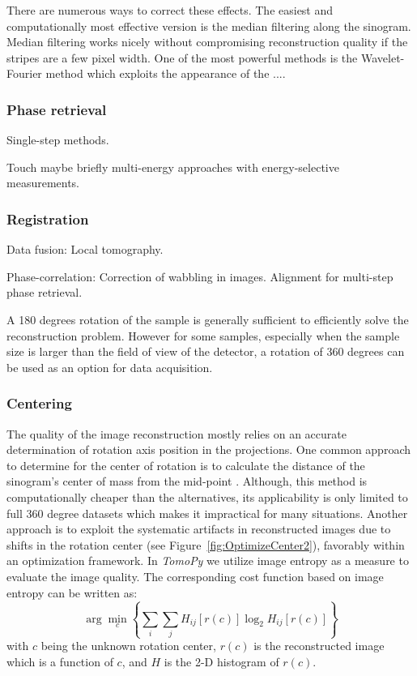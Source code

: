 \documentclass[pdf]{iucr}              %
\begin{document}
There are numerous ways to correct these effects. The easiest and computationally most effective version is the median filtering along the sinogram. Median filtering works nicely without compromising reconstruction quality if the stripes are a few pixel width. One of the most powerful methods is the Wavelet-Fourier method which exploits the appearance of the ....

\subsubsection{Phase retrieval}

Single-step methods. 

Touch maybe briefly multi-energy approaches with energy-selective measurements.


\subsubsection{Registration}

Data fusion: Local tomography. 

Phase-correlation: Correction of wabbling in images. Alignment for multi-step phase retrieval.

A 180 degrees rotation of the sample is generally sufficient to efficiently solve the reconstruction problem. However for some samples, especially when the sample size is larger than the field of view of the detector, a  rotation of 360 degrees can be used as an option for data acquisition. 

\subsubsection{Centering}

The quality of the image reconstruction mostly relies on an accurate determination of rotation axis position in the projections.  One common approach to determine for the center of rotation is to calculate the distance of the sinogram's center of mass from the mid-point \cite{Azevedo}. Although, this method is computationally cheaper than the alternatives, its applicability is only limited to full 360 degree datasets which makes it impractical for many situations. Another approach is to exploit the systematic artifacts in reconstructed images due to shifts in the rotation center (see Figure~\ref{fig:OptimizeCenter2}), favorably within an optimization framework. In \textit{TomoPy} we utilize image entropy as a measure to evaluate the image quality. The corresponding cost function based on image entropy can be written as:
\begin{equation}
\arg \min_c \left\{\sum_i \sum_jH_{ij}\left[r(c)\right]\log_2 H_{ij}\left[r(c)\right]\right\}
\end{equation}
with $c$ being the unknown rotation center, $r(c)$ is the reconstructed image which is a function of $c$, and $H$ is the 2-D histogram of $r(c)$. 
\end{document}
